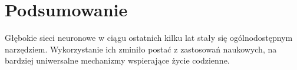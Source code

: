 \documentclass[12pt,a4paper,twoside,titlepage,openright]{book}
\begin{document}

\chapter*{Podsumowanie}
Głębokie sieci neuronowe w ciągu ostatnich kilku lat stały się ogólnodostępnym narzędziem. Wykorzystanie ich zminiło postać z zastosowań naukowych, na bardziej uniwersalne mechanizmy wspierające życie codzienne.


\listoffigures


\printbibliography
\end{document}
